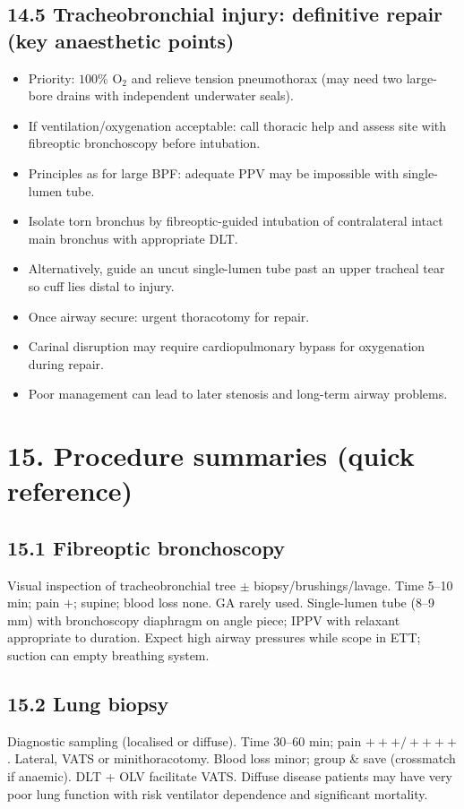\documentclass[11pt,a4paper]{article}
\begin{document}
\subsection{14.5 Tracheobronchial injury: definitive repair (key anaesthetic points)}
\begin{itemize}[leftmargin=*, itemsep=2pt]
  \item Priority: \(100\%\) \(\mathrm{O_2}\) and relieve tension pneumothorax (may need two large-bore drains with independent underwater seals).
  \item If ventilation/oxygenation acceptable: call thoracic help and assess site with fibreoptic bronchoscopy before intubation.
  \item Principles as for large BPF: adequate PPV may be impossible with single-lumen tube.
  \item Isolate torn bronchus by fibreoptic-guided intubation of contralateral intact main bronchus with appropriate DLT.
  \item Alternatively, guide an uncut single-lumen tube past an upper tracheal tear so cuff lies distal to injury.
  \item Once airway secure: urgent thoracotomy for repair.
  \item Carinal disruption may require cardiopulmonary bypass for oxygenation during repair.
  \item Poor management can lead to later stenosis and long-term airway problems.
\end{itemize}

\section{15. Procedure summaries (quick reference)}

\subsection{15.1 Fibreoptic bronchoscopy}
Visual inspection of tracheobronchial tree \(\pm\) biopsy/brushings/lavage. Time 5--10 min; pain \(+\); supine; blood loss none. GA rarely used. Single-lumen tube (8--9 mm) with bronchoscopy diaphragm on angle piece; IPPV with relaxant appropriate to duration. Expect high airway pressures while scope in ETT; suction can empty breathing system.

\subsection{15.2 Lung biopsy}
Diagnostic sampling (localised or diffuse). Time 30--60 min; pain \(+++/++++\). Lateral, VATS or minithoracotomy. Blood loss minor; group \& save (crossmatch if anaemic). DLT + OLV facilitate VATS. Diffuse disease patients may have very poor lung function with risk ventilator dependence and significant mortality.
\end{document}
